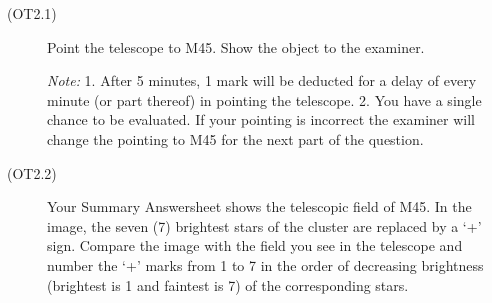 \begin{description}
\item[(OT2.1)] Point the telescope to M45. Show the object to the examiner.

  \emph{Note:} 1. After 5 minutes, 1 mark will be deducted for a delay of
  every minute (or part thereof) in pointing the telescope.
  2. You have a single chance to be evaluated. If your pointing is incorrect
  the examiner will change the pointing to M45 for the next part of the
  question.
\item[(OT2.2)] Your Summary Answersheet shows the telescopic field of M45.
  In the image, the seven (7) brightest stars of the cluster are replaced by
  a `+' sign. Compare the image with the field you see in the telescope and
  number the `+' marks from 1 to 7 in the order of decreasing brightness
  (brightest is 1 and faintest is 7) of the corresponding stars.
\end{description}

